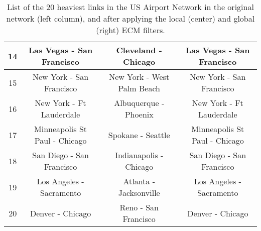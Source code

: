 \documentclass[aps,twocolumn,superscriptaddress]{revtex4-1}
\begin{document}
\begin{table*}[t]
\begin{center}
\begin{tabular}{||c | c | c | c||}
 \hline
 14 & Las Vegas - San Francisco & Cleveland - Chicago & Las Vegas - San Francisco \\ 
 \hline
 15 & New York - San Francisco & New York - West Palm Beach & New York - San Francisco \\
 \hline
 16 & New York - Ft Lauderdale & Albuquerque - Phoenix & New York - Ft Lauderdale \\
 \hline
 17 & Minneapolis St Paul - Chicago & Spokane - Seattle & Minneapolis St Paul - Chicago \\ 
 \hline
 18 & San Diego - San Francisco & Indianapolis - Chicago & San Diego - San Francisco \\
 \hline
 19 & Los Angeles - Sacramento & Atlanta - Jacksonville & Los Angeles - Sacramento \\
 \hline
 20 & Denver - Chicago & Reno - San Francisco & Denver - Chicago \\ 
 \hline
\end{tabular}
%
\end{center}
\caption{List of the 20 heaviest links in the US Airport Network in the original network (left column), and after applying the local (center) and global (right) ECM filters.}
\label{tab:links_glob_loc_wei_usair}
\end{table*}
%
\end{document}
